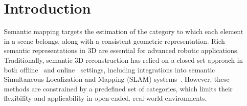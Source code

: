 \section{Introduction}
\label{sec:intro}
Semantic mapping targets the estimation of  the category to which each element in a scene belongs, along with a consistent geometric representation. Rich semantic representations in 3D are essential for advanced robotic applications.
Traditionally, semantic 3D reconstruction has relied on a closed-set approach in both offline~\cite{bao2011semantic,kundu2022panoptic} and online~\cite{mccormac2017semanticfusion,rosinol2020kimera} settings, including integrations into semantic Simultaneous Localization and Mapping (SLAM) systems~\cite{civera2011towards,zhu2024sni,li2024sgs}.
However, these methods are constrained by a predefined set of categories, which limits their flexibility and applicability in open-ended, real-world environments.

